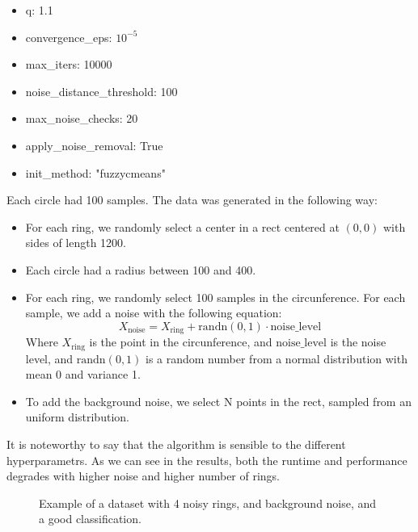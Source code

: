 \documentclass[conference]{IEEEtran}
\begin{document}
\begin{itemize}
    \item q: 1.1
    \item convergence\_eps: $10^{-5}$
    \item max\_iters: 10000
    \item noise\_distance\_threshold: 100
    \item max\_noise\_checks: 20
    \item apply\_noise\_removal: True
    \item init\_method: "fuzzycmeans"
\end{itemize}

Each circle had 100 samples.
The data was generated in the following way:
\begin{itemize}
    \item For each ring, we randomly select a center in a rect centered at $(0, 0)$ with sides of length 1200.
    \item Each circle had a radius between 100 and 400.
    \item For each ring, we randomly select 100 samples in the circunference. For each sample, we add a noise with the following equation:
    \begin{equation}
        X_{\text{noise}} = X_{\text{ring}} + \text{randn}(0, 1) \cdot \text{noise\_level}
    \end{equation}
    Where $X_{\text{ring}}$ is the point in the circunference, and $\text{noise\_level}$ is the noise level, and $\text{randn}(0, 1)$ is a random number from a normal distribution with mean 0 and variance 1.
    \item To add the background noise, we select N points in the rect, sampled from an uniform distribution.
\end{itemize}

It is noteworthy to say that the algorithm is sensible to the different hyperparametrs.
As we can see in the results, both the runtime and performance degrades with higher noise and higher number of rings.
\begin{figure}[H]
    \centering
    \resizebox{0.9\linewidth}{!}{}
    \label{fig:excentric_rings}
    \caption{Example of a dataset with 4 noisy rings, and background noise, and a good classification.}
\end{figure}
\end{document}
